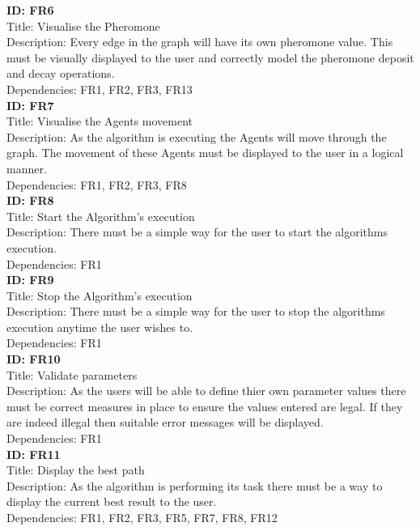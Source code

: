 \noindent
\textbf{ID: FR6}\\
Title: Visualise the Pheromone\\
Description: Every edge in the graph will have its own pheromone value. This must be visually displayed to the user and correctly model the pheromone deposit and decay operations.\\
Dependencies: FR1, FR2, FR3, FR13
\\

\noindent
\textbf{ID: FR7}\\
Title: Visualise the Agents movement\\
Description: As the algorithm is executing the Agents will move through the graph. The movement of these Agents must be displayed to the user in a logical manner.\\
Dependencies: FR1, FR2, FR3, FR8
\\

\noindent
\textbf{ID: FR8}\\
Title: Start the Algorithm's execution\\
Description: There must be a simple way for the user to start the algorithms execution. \\
Dependencies: FR1
\\

\noindent
\textbf{ID: FR9}\\
Title: Stop the Algorithm's execution\\
Description: There must be a simple way for the user to stop the algorithms execution anytime the user wishes to. \\
Dependencies: FR1
\\

\noindent
\textbf{ID: FR10}\\
Title: Validate parameters\\
Description: As the users will be able to define thier own parameter values there must be correct measures in place to ensure the values entered are legal. If they are indeed illegal then suitable error messages will be displayed. \\
Dependencies: FR1
\\

\noindent
\textbf{ID: FR11}\\
Title: Display the best path\\
Description: As the algorithm is performing its task there must be a way to display the current best result to the user. \\
Dependencies: FR1, FR2, FR3, FR5, FR7, FR8, FR12
\\

